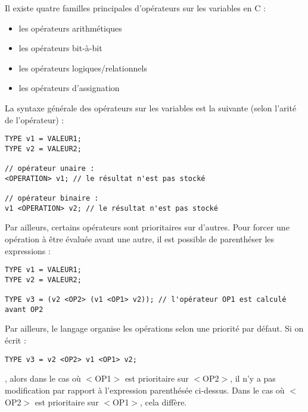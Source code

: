 \documentclass[../../../main.tex]{subfiles}
\begin{document}

Il existe quatre familles principales d'opérateurs sur les variables en C :
\begin{itemize}
	\item les opérateurs arithmétiques
	\item les opérateurs bit-à-bit
	\item les opérateurs logiques/relationnels
	\item les opérateurs d'assignation
\end{itemize}
La syntaxe générale des opérateurs sur les variables est la suivante (selon l'arité de l'opérateur) :
\begin{verbatim}
TYPE v1 = VALEUR1;
TYPE v2 = VALEUR2;

// opérateur unaire :
<OPERATION> v1; // le résultat n'est pas stocké

// opérateur binaire :
v1 <OPERATION> v2; // le résultat n'est pas stocké
\end{verbatim}
Par ailleurs, certains opérateurs sont prioritaires sur d'autres. Pour forcer une opération à être évaluée avant une autre, il est possible de parenthéser les expressions :
\begin{verbatim}
TYPE v1 = VALEUR1;
TYPE v2 = VALEUR2;

TYPE v3 = (v2 <OP2> (v1 <OP1> v2)); // l'opérateur OP1 est calculé avant OP2
\end{verbatim}
Par ailleurs, le langage organise les opérations selon une priorité par défaut. Si on écrit :
\begin{verbatim}
TYPE v3 = v2 <OP2> v1 <OP1> v2;
\end{verbatim}
, alors dans le cas où \textsf{$<$OP1$>$} est prioritaire sur \textsf{$<$OP2$>$}, il n'y a pas modification par rapport à l'expression parenthésée ci-dessus. Dans le cas où \textsf{$<$OP2$>$} est prioritaire sur \textsf{$<$OP1$>$}, cela diffère.
 
\end{document}
